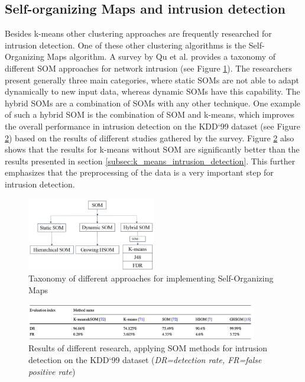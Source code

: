 \subsection{Self-organizing Maps and intrusion detection}
Besides k-means other clustering approaches are frequently researched for intrusion detection. One of these other clustering algorithms is the Self-Organizing Maps algorithm. A survey by Qu et al. \cite{qu2021survey} provides a taxonomy of different SOM approaches for network intrusion (see Figure \ref{fig:som_taxonomy}). The researchers present generally three main categories, where static SOMs are not able to adapt dynamically to new input data, whereas dynamic SOMs have this capability. The hybrid SOMs are a combination of SOMs with any other technique. One example of such a hybrid SOM is the combination of SOM and k-means, which improves the overall performance in intrusion detection on the KDD`99 dataset (see Figure \ref{fig:som_kmeans}) based on the results of different studies gathered by the survey. Figure \ref{fig:som_kmeans} also shows that the results for k-means without SOM are significantly better than the results presented in section \ref{subsec:k_means_intrusion_detection}. This further emphasizes that the preprocessing of the data is a very important step for intrusion detection.

\begin{figure}[H]
	\sffamily\footnotesize
	\includegraphics[width=0.5\textwidth]{pic/som_taxonomy.png}
	\unitlength=0.5mm
	\linethickness{0.4pt}
	\caption{Taxonomy of different approaches for implementing Self-Organizing Maps \cite{qu2021survey}}
	\label{fig:som_taxonomy}
\end{figure}

\begin{figure}[H]
	\sffamily\footnotesize
	\includegraphics[width=0.9\textwidth]{pic/som_kmeans.png}
	\unitlength=0.5mm
	\linethickness{0.4pt}
	\caption{Results of different research, applying SOM methods for intrusion detection on the KDD`99 dataset (\emph{DR=detection rate, FR=false positive rate}) \cite{qu2021survey}}
	\label{fig:som_kmeans}
\end{figure}
